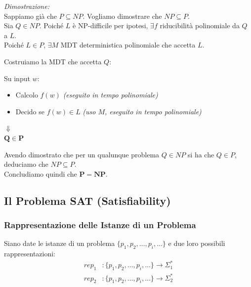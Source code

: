 \vspace{0.3cm}
\textit{Dimostrazione:} \\
Sappiamo già che $P \subseteq NP$. Vogliamo dimostrare che $NP \subseteq P$. \\
Sia $Q \in NP$. Poiché $L$ è NP-difficile per ipotesi, $\exists f$ riducibilità polinomiale da $Q$ a $L$. \\
Poiché $L \in P$, $\exists M$ MDT deterministica polinomiale che accetta $L$.

\vspace{0.2cm}
Costruiamo la MDT che accetta $Q$: 
\begin{center}
\end{center}

\vspace{0.1cm}
Su input $w$:
\begin{itemize}
    \item[$\circ$] Calcolo $f(w)$ \hspace{2cm} \textit{(eseguito in tempo polinomiale)}
    \item[$\circ$] Decido se $f(w) \in L$ \hspace{0.85cm} \textit{(uso $M$, eseguito in tempo polinomiale)}
\end{itemize}

\begin{center}
    $\Downarrow$ \\[0.1cm]
    $\mathbf{Q \in P}$
\end{center}
Avendo dimostrato che per un qualunque problema $Q \in NP$ si ha che $Q \in P$, deduciamo che $NP \subseteq P$. \\
Concludiamo quindi che $\mathbf{P = NP}$.












\subsection{Il Problema SAT (Satisfiability)}
\subsubsection{Rappresentazione delle Istanze di un Problema}

Siano date le istanze di un problema $\{p_1, p_2, \dots, p_i, \dots\}$ e due loro possibili rappresentazioni:
\begin{align*}
    rep_1&: \{p_1, p_2, \dots, p_i, \dots\} \longrightarrow \Sigma_1^* \\
    rep_2&: \{p_1, p_2, \dots, p_i, \dots\} \longrightarrow \Sigma_2^*
\end{align*}

